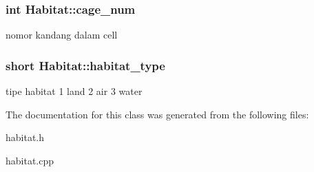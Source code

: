 \subsubsection[{\texorpdfstring{cage\+\_\+num}{cage_num}}]{\setlength{\rightskip}{0pt plus 5cm}int Habitat\+::cage\+\_\+num\hspace{0.3cm}{\ttfamily [protected]}}\hypertarget{class_habitat_aa710d22ca33060d2f81ca33f9833cb93}{}\label{class_habitat_aa710d22ca33060d2f81ca33f9833cb93}
nomor kandang dalam cell 
\subsubsection[{\texorpdfstring{habitat\+\_\+type}{habitat_type}}]{\setlength{\rightskip}{0pt plus 5cm}short Habitat\+::habitat\+\_\+type\hspace{0.3cm}{\ttfamily [protected]}}\hypertarget{class_habitat_aa2d593697c3e7c1c0c52b3804c019e01}{}\label{class_habitat_aa2d593697c3e7c1c0c52b3804c019e01}
tipe habitat 1 land 2 air 3 water 

The documentation for this class was generated from the following files\+:\begin{DoxyCompactItemize}
\item 
habitat.\+h\item 
habitat.\+cpp\end{DoxyCompactItemize}

